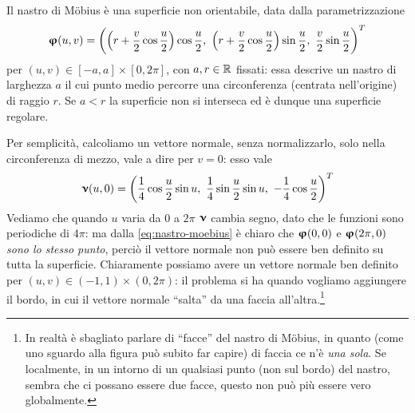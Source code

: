 \begin{esempio} \label{es:nastro-moebius}
	Il nastro di M\"obius è una superficie non orientabile, data dalla parametrizzazione
	\begin{equation}
		\bm{\upvarphi}(u,v)=\bigg(
			\Big(r+\dfrac{v}2\cos\dfrac{u}2\Big)\cos\dfrac{u}2,\
			\Big(r+\dfrac{v}2\cos\dfrac{u}2\Big)\sin\dfrac{u}2,\
			\dfrac{v}2\sin\dfrac{u}2
		\bigg)^T
		\label{eq:nastro-moebius}
	\end{equation}
	per $(u,v)\in[-a,a]\times[0,2\pi]$, con $a,r\in\mathbb{R}$ fissati: essa descrive un nastro di larghezza $a$ il cui punto medio percorre una circonferenza (centrata nell'origine) di raggio $r$.
	Se $a<r$ la superficie non si interseca ed è dunque una superficie regolare.
	
	Per semplicità, calcoliamo un vettore normale, senza normalizzarlo, solo nella circonferenza di mezzo, vale a dire per $v=0$: esso vale
	\begin{equation}
		\bm{\upnu}(u,0)=\bigg(
			\dfrac14\cos\dfrac{u}2\sin u,\
			\dfrac14\sin\dfrac{u}2\sin u,\
			-\dfrac14\cos\dfrac{u}2
		\bigg)^T
		\label{eq:vettore-normale-centro-nastro-mobius}
	\end{equation}
	Vediamo che quando $u$ varia da 0 a $2\pi$ $\bm{\upnu}$ cambia segno, dato che le funzioni sono periodiche di $4\pi$: ma dalla \eqref{eq:nastro-moebius} è chiaro che $\bm{\upvarphi}(0,0)$ e $\bm{\upvarphi}(2\pi,0)$ \emph{sono lo stesso punto}, perciò il vettore normale non può essere ben definito su tutta la superficie.
	Chiaramente possiamo avere un vettore normale ben definito per $(u,v)\in(-1,1)\times(0,2\pi)$: il problema si ha quando vogliamo aggiungere il bordo, in cui il vettore normale ``salta'' da una faccia all'altra.\footnote{
		In realtà è sbagliato parlare di ``facce'' del nastro di M\"obius, in quanto (come uno sguardo alla figura può subito far capire) di faccia ce n'è \emph{una sola}.
		Se localmente, in un intorno di un qualsiasi punto (non sul bordo) del nastro, sembra che ci possano essere due facce, questo non può più essere vero globalmente.
	}
\end{esempio}

